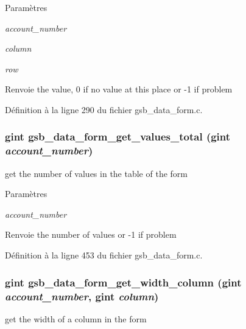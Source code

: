 \begin{DoxyParams}{Paramètres}
\item[{\em account\_\-number}]\item[{\em column}]\item[{\em row}]\end{DoxyParams}
\begin{DoxyReturn}{Renvoie}
the value, 0 if no value at this place or -\/1 if problem 
\end{DoxyReturn}


Définition à la ligne 290 du fichier gsb\_\-data\_\-form.c.

\subsubsection[{gsb\_\-data\_\-form\_\-get\_\-values\_\-total}]{\setlength{\rightskip}{0pt plus 5cm}gint gsb\_\-data\_\-form\_\-get\_\-values\_\-total (gint {\em account\_\-number})}\label{gsb__data__form_8c_af78c7a67288bda5ba85257a29317fc0a}
get the number of values in the table of the form


\begin{DoxyParams}{Paramètres}
\item[{\em account\_\-number}]\end{DoxyParams}
\begin{DoxyReturn}{Renvoie}
the number of values or -\/1 if problem 
\end{DoxyReturn}


Définition à la ligne 453 du fichier gsb\_\-data\_\-form.c.

\subsubsection[{gsb\_\-data\_\-form\_\-get\_\-width\_\-column}]{\setlength{\rightskip}{0pt plus 5cm}gint gsb\_\-data\_\-form\_\-get\_\-width\_\-column (gint {\em account\_\-number}, \/  gint {\em column})}\label{gsb__data__form_8c_a7e138cf8515b9688315d67ef12c338d9}
get the width of a column in the form


